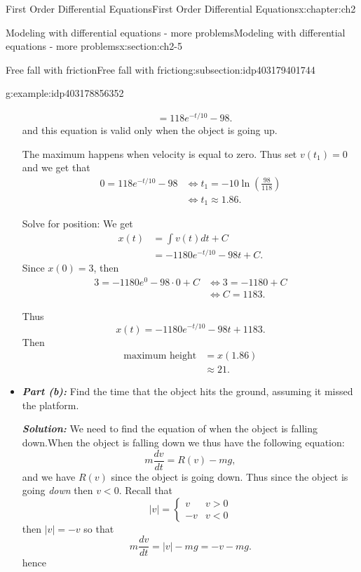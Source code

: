 \documentclass[oneside,10pt,]{book}
\newcommand{\alert}[1]{\textbf{\textit{#1}}}
\numberwithin{equation}{section}
\numberwithin{equation}{section}
\newcommand{\lt}{<}
\newcommand{\amp}{&}
\begin{document}
\begin{chapterptx}{First Order Differential Equations}{}{First Order Differential Equations}{}{}{x:chapter:ch2}
\begin{sectionptx}{Modeling with differential equations - more problems}{}{Modeling with differential equations - more problems}{}{}{x:section:ch2-5}
\begin{subsectionptx}{Free fall with friction}{}{Free fall with friction}{}{}{g:subsection:idp403179401744}
\begin{example}{}{g:example:idp403178856352}
\begin{itemize}[label=\textbullet]
\begin{align*}
\amp =118e^{-t/10}-98.
\end{align*}
and this equation is valid only when the object is going up.%
\par
The maximum happens when velocity is equal to zero. Thus set \(v(t_{1})=0\) and we get that%
\begin{align*}
0=118e^{-t/10}-98 \amp \iff t_{1}=-10\ln\left(\frac{98}{118}\right)\\
\amp \iff t_{1}\approx1.86.
\end{align*}
%
\par
Solve for position: We get%
\begin{align*}
x(t) \amp =\int v(t)dt+C\\
\amp =-1180e^{-t/10}-98t+C.
\end{align*}
Since \(x(0)=3\), then%
\begin{align*}
3=-1180e^{0}-98\cdot0+C \amp \iff3=-1180+C\\
\amp \iff C=1183.
\end{align*}
%
\par
Thus%
\begin{equation*}
x(t)=-1180e^{-t/10}-98t+1183.
\end{equation*}
Then%
\begin{align*}
\text{maximum height} \amp =x(1.86)\\
\amp \approx21.
\end{align*}
%
\item{}\alert{Part (b):} Find the time that the object hits the ground, assuming it missed the platform.%
\par
\alert{Solution:} We need to find the equation of when the object is falling down.When the object is falling down we thus have the following equation:%
\begin{equation*}
m\frac{dv}{dt}=R(v)-mg,
\end{equation*}
and we have \(R(v)\) since the object is going down. Thus since the object is going \emph{down} then \(v\lt0\). Recall that%
\begin{equation*}
\left|v\right|=\begin{cases}
v \amp v>0\\
-v \amp v\lt0
\end{cases}
\end{equation*}
then \(\left|v\right|=-v\) so that%
\begin{equation*}
m\frac{dv}{dt}=\left|v\right|-mg=-v-mg.
\end{equation*}
hence%
\begin{equation*}

\end{equation*}
\end{itemize}
\end{example}
\end{subsectionptx}
\end{sectionptx}
\end{chapterptx}
\end{document}
